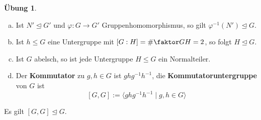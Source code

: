 \documentclass[a4paper]{report}
\theoremstyle{plain}
\theoremstyle{definition}
\newtheorem{ubng}[thm]{Übung}
\begin{document}
\begin{ubng} \item
  \begin{enumerate}[(a)]
          \item Ist $N' \trianglelefteq G'$ und $\varphi : G \to G'$ Gruppenhomomorphismus, so gilt $\varphi^{-1}(N') \trianglelefteq G$.
    \item Ist $h \le G$ eine Untergruppe mit $[G:H] = \# \faktor GH= 2$, so folgt $H \trianglelefteq G$.
    \item Ist $G$ abelsch, so ist jede Untergruppe $H \le G$ ein Normalteiler.
    \item Der \textbf{Kommutator} zu $g, h \in G$ ist $ghg^{-1}h^{-1}$, die \textbf{Kommutatoruntergruppe} von $G$ ist $$[G, G]:= \langle ghg^{-1}h^{-1} \mid g, h \in G \rangle$$
\end{enumerate}
Es gilt $[G, G] \trianglelefteq G.$
\end{ubng}
\end{document}
